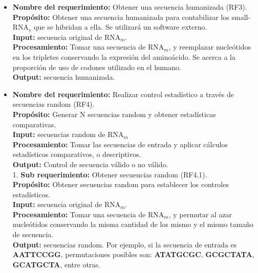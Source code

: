 \documentclass[12pt,a4paper,spanish]{article}
\begin{document}
\begin{itemize}
		\item \textbf{Nombre del requerimiento:} Obtener una secuencia humanizada (RF3).\\
 	    \textbf{Propósito:} Obtener una secuencia humanizada para contabilizar los small-RNA$_s$ 
							que se hibridan a ella. Se utilizará un software externo.\\
		\textbf{Input:} secuencia original de RNA$_m$.\\
		\textbf{Procesamiento:} Tomar una secuencia de RNA$_m$, y reemplazar nucleótidos en los tripletes conservando la 									expresión del aminoácido. Se acerca a la proporción de uso de codones utilizado en el 									humano. \\
		\textbf{Output:} secuencia humanizada.\\


		\item \textbf{Nombre del requerimiento:} Realizar control estadístico a través de secuencias random (RF4).\\
 	    \textbf{Propósito:} Generar N secuencias random y obtener estadísticas comparativas. \\
		\textbf{Input:} secuencias random de RNA$_m$ \\
		\textbf{Procesamiento:} Tomar las secuencias de entrada y aplicar cálculos estadísticos comparativos, o 								descriptivos. \\
		\textbf{Output:} Control de secuencia válido o no válido. \\

		1. \textbf{Sub requerimiento:} Obtener secuencias random (RF4.1).\\
 	    \textbf{Propósito:} Obtener secuencias random para establecer los controles estadísticos.\\
		\textbf{Input:} secuencia original de RNA$_m$.\\
		\textbf{Procesamiento:} Tomar una secuencia de RNA$_m$, y permutar al azar nucleótidos conservando la misma 								cantidad de los mismo y el mismo tamaño de secuencia. \\
		\textbf{Output:} secuencias random. Por ejemplo, si la secuencia de entrada es \textbf{AATTCCGG}, permutaciones 						posibles son: \textbf{ATATGCGC}, \textbf{GCGCTATA}, \textbf{GCATGCTA}, entre otras.	\\


\end{itemize}
\end{document}
